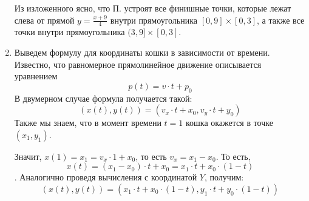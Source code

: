 \begin{enumerate}
Из изложенного ясно, что П. устроят все финишные точки, которые
лежат слева от прямой $y = \frac{x+9}{4}$ внутри прямоугольника $[0,9]\times[0,3]$,
а также все точки внутри прямоугольника $(3,9]\times[0,3]$.


\begin{center}\end{center}

\item Выведем формулу для координаты кошки в зависимости от времени.
Известно, что равномерное прямолинейное движение описывается уравнением
$$p(t) = v\cdot t + p_0$$
В двумерном случае формула получается такой:
$$(x(t),y(t)) = (v_x\cdot t + x_0,v_y\cdot t + y_0)$$
Также мы знаем, что в момент времени $t=1$ кошка окажется в точке $(x_1,y_1)$.

Значит, $x(1) = x_1 = v_x \cdot 1 + x_0$, то есть $v_x = x_1 - x_0$.
То есть, $$x(t) = (x_1 - x_0) \cdot t + x_0 = x_1 \cdot t + x_0 \cdot (1-t)$$.
Аналогично проведя вычисления с координатой $Y$, получим:
$$(x(t),y(t)) = (x_1 \cdot t + x_0 \cdot (1-t), y_1 \cdot t + y_0 \cdot (1-t))$$

\end{enumerate}
